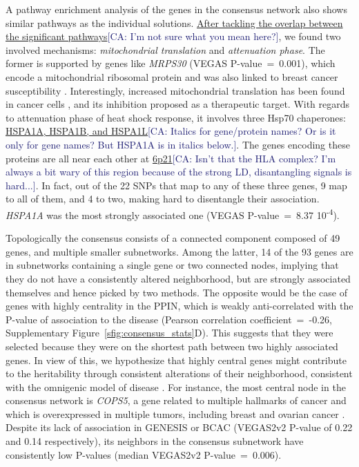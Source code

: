 \documentclass[twocolumn, 11pt]{article}
\newcommand{\cazcom}[2]{{\uline{#1}}\unskip\space\textcolor{MidnightBlue}{[CA: #2]}}
\begin{document}
A pathway enrichment analysis of the genes in the consensus network also shows similar pathways as the individual solutions. \cazcom{After tackling the overlap between the significant pathways}{I'm not sure what you mean here?}, we found two involved mechanisms: \emph{mitochondrial translation} and \emph{attenuation phase}. The former is supported by genes like \emph{MRPS30} (VEGAS P-value~=~0.001), which encode a mitochondrial ribosomal protein and was also linked to breast cancer susceptibility \cite{quigley_5p12_2014}. Interestingly, increased mitochondrial translation has been found in cancer cells \cite{Yu2016Repositioning}, and its inhibition proposed as a therapeutic target. With regards to attenuation phase of heat shock response, it involves three Hsp70 chaperones: \cazcom{HSPA1A, HSPA1B, and HSPA1L}{Italics for gene/protein names? Or is it only for gene names? But HSPA1A is in italics below.}. The genes encoding these proteins are all near each other at \cazcom{6p21}{Isn't that the HLA complex? I'm always a bit wary of this region because of the strong LD, disantangling signals is hard...}. In fact, out of the 22 SNPs that map to any of these three genes, 9 map to all of them, and 4 to two, making hard to disentangle their association. \emph{HSPA1A} was the most strongly associated one (VEGAS P-value~=~8.37 \texttimes{} 10\textsuperscript{-4}).  

Topologically the consensus consists of a connected component composed of 49 genes, and multiple smaller subnetworks. Among the latter, 14 of the 93 genes are in subnetworks containing a single gene or two connected nodes, implying that they do not have a consistently altered neighborhood, but are strongly associated themselves and hence picked by two methods. The opposite would be the case of genes with highly centrality in the PPIN, which is weakly anti-correlated with the P-value of association to the disease (Pearson correlation coefficient~=~-0.26, Supplementary Figure~\ref{sfig:consensus_stats}D). This suggests that they were selected because they were on the shortest path between two highly associated genes. In view of this, we hypothesize that highly central genes might contribute to the heritability through consistent alterations of their neighborhood, consistent with the omnigenic model of disease \cite{boyle_expanded_2017}. For instance, the most central node in the consensus network is \emph{COPS5}, a gene related to multiple hallmarks of cancer and which is overexpressed in multiple tumors, including breast and ovarian cancer \cite{liu_jab1_cops5_2018}. Despite its lack of association in GENESIS or BCAC (VEGAS2v2 P-value of 0.22 and 0.14 respectively), its neighbors in the consensus subnetwork have consistently low P-values (median VEGAS2v2 P-value~=~0.006).
\end{document}
